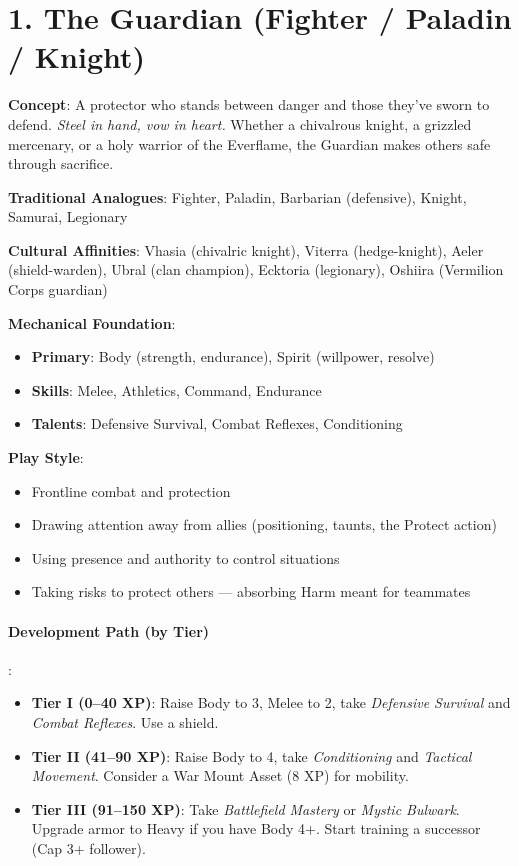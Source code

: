 \section{1. The Guardian (Fighter / Paladin / Knight)}
\label{sec:concept-guardian}

\textbf{Concept}: A protector who stands between danger and those they've sworn to defend. \emph{Steel in hand, vow in heart.} Whether a chivalrous knight, a grizzled mercenary, or a holy warrior of the Everflame, the Guardian makes others safe through sacrifice.

\textbf{Traditional Analogues}: Fighter, Paladin, Barbarian (defensive), Knight, Samurai, Legionary

\textbf{Cultural Affinities}: Vhasia (chivalric knight), Viterra (hedge-knight), Aeler (shield-warden), Ubral (clan champion), Ecktoria (legionary), Oshiira (Vermilion Corps guardian)

\textbf{Mechanical Foundation}:
\begin{itemize}
\item \textbf{Primary}: Body (strength, endurance), Spirit (willpower, resolve)
\item \textbf{Skills}: Melee, Athletics, Command, Endurance
\item \textbf{Talents}: Defensive Survival, Combat Reflexes, Conditioning
\end{itemize}

\textbf{Play Style}:
\begin{itemize}
\item Frontline combat and protection
\item Drawing attention away from allies (positioning, taunts, the Protect action)
\item Using presence and authority to control situations
\item Taking risks to protect others --- absorbing Harm meant for teammates
\end{itemize}

\paragraph{Development Path (by Tier)}:
\begin{itemize}
\item \textbf{Tier I (0--40 XP)}: Raise Body to 3, Melee to 2, take \emph{Defensive Survival} and \emph{Combat Reflexes}. Use a shield.
\item \textbf{Tier II (41--90 XP)}: Raise Body to 4, take \emph{Conditioning} and \emph{Tactical Movement}. Consider a War Mount Asset (8 XP) for mobility.
\item \textbf{Tier III (91--150 XP)}: Take \emph{Battlefield Mastery} or \emph{Mystic Bulwark}. Upgrade armor to Heavy if you have Body 4+. Start training a successor (Cap 3+ follower).
\end{itemize}

